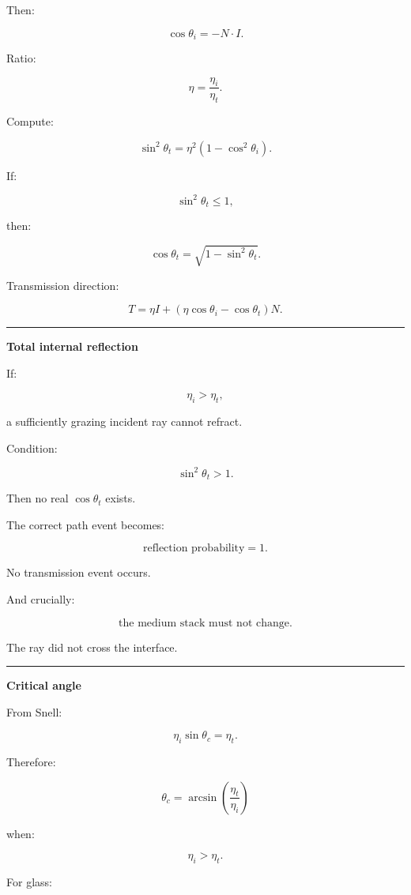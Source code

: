 Then:

\[
\cos\theta_i
=
-N\cdot I.
\]

Ratio:

\[
\eta=
\frac{\eta_i}{\eta_t}.
\]

Compute:

\[
\sin^2\theta_t
=
\eta^2
\left(
1-\cos^2\theta_i
\right).
\]

If:

\[
\sin^2\theta_t\le1,
\]

then:

\[
\cos\theta_t
=
\sqrt{
1-\sin^2\theta_t
}.
\]

Transmission direction:

\[
\boxed{
T
=
\eta I+
(
\eta\cos\theta_i-\cos\theta_t
)N.
}
\]

\begin{center}\rule{0.5\linewidth}{0.5pt}\end{center}

\textbf{Total internal reflection}

If:

\[
\eta_i>\eta_t,
\]

a sufficiently grazing incident ray cannot refract.

Condition:

\[
\boxed{
\sin^2\theta_t>1.
}
\]

Then no real \(\cos\theta_t\) exists.

The correct path event becomes:

\[
\boxed{
\text{reflection probability}=1.
}
\]

No transmission event occurs.

And crucially:

\[
\boxed{
\text{the medium stack must not change.}
}
\]

The ray did not cross the interface.

\begin{center}\rule{0.5\linewidth}{0.5pt}\end{center}

\textbf{Critical angle}

From Snell:

\[
\eta_i\sin\theta_c
=
\eta_t.
\]

Therefore:

\[
\boxed{
\theta_c
=
\arcsin
\left(
\frac{\eta_t}{\eta_i}
\right)
}
\]

when:

\[
\eta_i>\eta_t.
\]

For glass:

